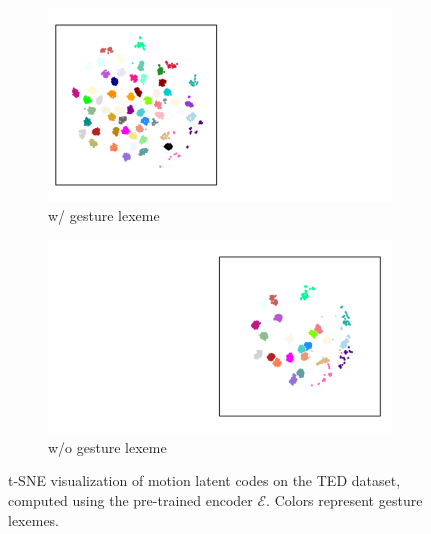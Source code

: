 \begin{figure}[t]
    \centering
    \begin{subfigure}[t]{0.47\linewidth}
        \centering
        \includegraphics[width=\linewidth]{figures/fig11a.pdf}
        \caption{w/ gesture lexeme}
        \label{fig:fig11a}
    \end{subfigure}
    \hspace{\fill}
    \begin{subfigure}[t]{0.47\linewidth}
        \centering
        \includegraphics[width=\linewidth]{figures/fig11b.pdf}
        \caption{w/o gesture lexeme}
        \label{fig:fig11b}
    \end{subfigure}
    \caption{t-SNE visualization of motion latent codes on the TED dataset, computed using the pre-trained encoder $\mathcal{E}$. Colors represent gesture lexemes.}
    \label{fig:fig11}
    \Description{}
\end{figure}
%
